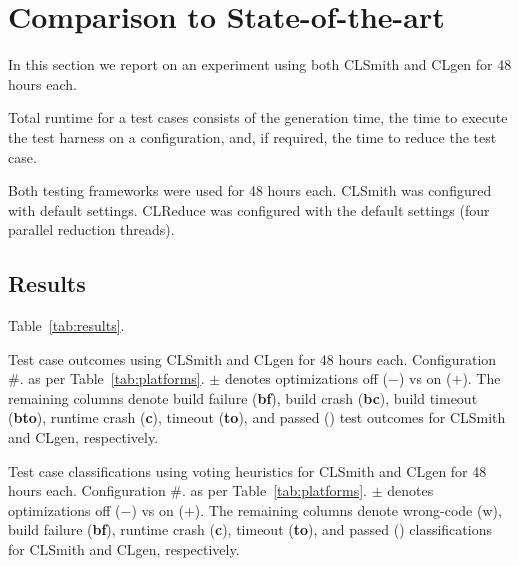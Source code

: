 \section{Comparison to State-of-the-art}\label{sec:vs_clsmith}

In this section we report on an experiment using both CLSmith and CLgen for 48 hours each.

Total runtime for a test cases consists of the generation time, the time to execute the test harness on a configuration, and, if required, the time to reduce the test case.

Both testing frameworks were used for 48 hours each. CLSmith was configured with default settings. CLReduce was configured with the default settings (four parallel reduction threads).

\subsection{Results}

Table~\ref{tab:results}.

\begin{table}
	\scriptsize %
	\centering %
	
	\caption{Test case outcomes using CLSmith and CLgen for 48 hours each. Configuration \#. as per Table~\ref{tab:platforms}. $\pm$ denotes optimizations off ($-$) vs on ($+$). The remaining columns denote build failure (\textbf{bf}), build crash (\textbf{bc}), build timeout (\textbf{bto}), runtime crash (\textbf{c}), timeout (\textbf{to}), and passed (\textbf{\cmark}) test outcomes for CLSmith and CLgen, respectively. }
	\label{tab:outcomes}
\end{table}

\begin{table}
	\scriptsize %
	\centering %
	
	\caption{Test case classifications using voting heuristics for CLSmith and CLgen for 48 hours each. Configuration \#. as per Table~\ref{tab:platforms}. $\pm$ denotes optimizations off ($-$) vs on ($+$). The remaining columns denote wrong-code (w), build failure (\textbf{bf}), runtime crash (\textbf{c}), timeout (\textbf{to}), and passed (\textbf{\cmark}) classifications for CLSmith and CLgen, respectively. }
	\label{tab:results}
\end{table}

